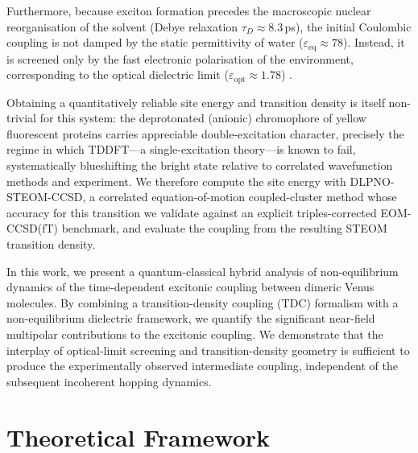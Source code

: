 \documentclass[journal=jpcbfk, manuscript=article, layout=twocolumn, doi=true]{achemso}
\begin{document}
Furthermore, because exciton formation precedes the macroscopic nuclear reorganisation of the solvent (Debye relaxation $\tau_D \approx 8.3$\,ps), the initial Coulombic coupling is not damped by the static permittivity of water ($\varepsilon_{\mathrm{eq}} \approx 78$). Instead, it is screened only by the fast electronic polarisation of the environment, corresponding to the optical dielectric limit ($\varepsilon_{\mathrm{opt}} \approx 1.78$) \cite{mennucci2012, scholes2003}.

Obtaining a quantitatively reliable site energy and transition density is itself non-trivial for this system: the deprotonated (anionic) chromophore of yellow fluorescent proteins carries appreciable double-excitation character, precisely the regime in which TDDFT---a single-excitation theory---is known to fail, systematically blueshifting the bright state relative to correlated wavefunction methods and experiment. We therefore compute the site energy with DLPNO-STEOM-CCSD, a correlated equation-of-motion coupled-cluster method whose accuracy for this transition we validate against an explicit triples-corrected EOM-CCSD(fT) benchmark, and evaluate the coupling from the resulting STEOM transition density.

In this work, we present a quantum-classical hybrid analysis of non-equilibrium dynamics of the time-dependent excitonic coupling between dimeric Venus molecules. By combining a transition-density coupling (TDC) formalism with a non-equilibrium dielectric framework, we quantify the significant near-field multipolar contributions to the excitonic coupling. We demonstrate that the interplay of optical-limit screening and transition-density geometry is sufficient to produce the experimentally observed intermediate coupling, independent of the subsequent incoherent hopping dynamics.
\section{Theoretical Framework}
\end{document}

